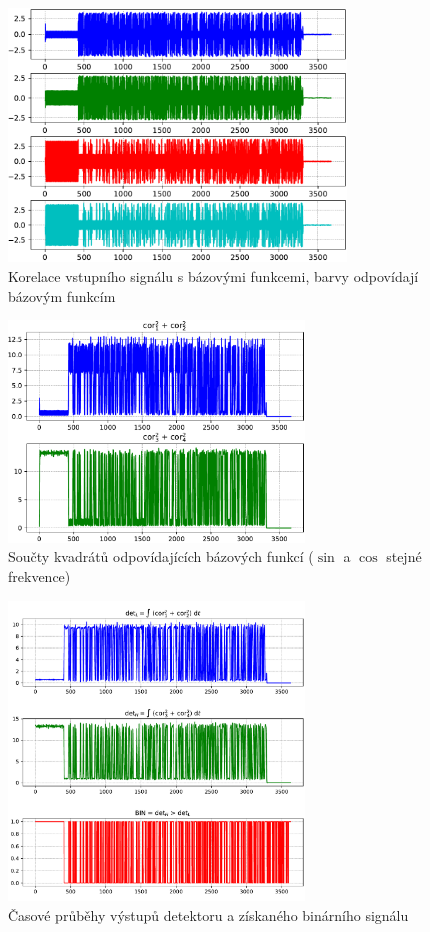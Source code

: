 \begin{figure}[H]
    \centering
    \includegraphics[width=0.8\textwidth]{img/cor.pdf}
    \caption{Korelace vstupního signálu s bázovými funkcemi, barvy odpovídají bázovým funkcím}
\end{figure}

\begin{figure}[H]
    \centering
    \includegraphics[width=0.7\textwidth]{img/cor_sum.pdf}
    \caption{Součty kvadrátů odpovídajících bázových funkcí ($\sin$ a $\cos$ stejné frekvence)}
\end{figure}

\begin{figure}[H]
    \centering
    \includegraphics[width=0.7\textwidth]{img/dem2_graph.pdf}
    \caption{Časové průběhy výstupů detektoru a získaného binárního signálu}
\end{figure}